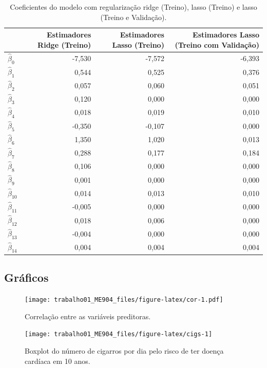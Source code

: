 \documentclass[
  12pt,
]{article}
\begin{document}
\begin{table}[H]

\caption{\label{tab:coefi_final}Coeficientes do modelo com regularização ridge (Treino), lasso (Treino) e lasso (Treino e Validação).}
\centering
\fontsize{10}{12}\selectfont
\begin{tabular}[t]{lrrr}
\toprule
  & Estimadores Ridge (Treino) & Estimadores Lasso (Treino) & Estimadores Lasso (Treino com Validação)\\
\midrule
$\hat{\beta}_0$ & -7,530 & -7,572 & -6,393\\
$\hat{\beta}_1$ & 0,544 & 0,525 & 0,376\\
$\hat{\beta}_2$ & 0,057 & 0,060 & 0,051\\
$\hat{\beta}_3$ & 0,120 & 0,000 & 0,000\\
$\hat{\beta}_4$ & 0,018 & 0,019 & 0,010\\
$\hat{\beta}_5$ & -0,350 & -0,107 & 0,000\\
$\hat{\beta}_6$ & 1,350 & 1,020 & 0,013\\
$\hat{\beta}_7$ & 0,288 & 0,177 & 0,184\\
$\hat{\beta}_8$ & 0,106 & 0,000 & 0,000\\
$\hat{\beta}_9$ & 0,001 & 0,000 & 0,000\\
$\hat{\beta}_{10}$ & 0,014 & 0,013 & 0,010\\
$\hat{\beta}_{11}$ & -0,005 & 0,000 & 0,000\\
$\hat{\beta}_{12}$ & 0,018 & 0,006 & 0,000\\
$\hat{\beta}_{13}$ & -0,004 & 0,000 & 0,000\\
$\hat{\beta}_{14}$ & 0,004 & 0,004 & 0,004\\
\bottomrule
\end{tabular}
\end{table}

\newpage

\subsection{Gráficos}

\begin{figure}
\centering
\texttt{[image: trabalho01\_ME904\_files/figure-latex/cor-1.pdf]}
\caption{Correlação entre as variáveis preditoras.}
\end{figure}

\begin{figure}

{\centering \texttt{[image: trabalho01\_ME904\_files/figure-latex/cigs-1]} 

}

\caption{Boxplot do número de cigarros por dia  pelo risco de ter doença cardíaca em 10 anos.}\label{fig:cigs}
\end{figure}
\end{document}
